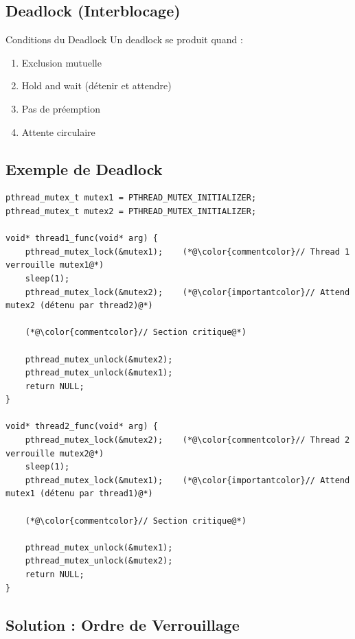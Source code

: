 \documentclass[11pt,a4paper]{article}
\begin{document}
\subsection{Deadlock (Interblocage)}

\begin{importantbox}{Conditions du Deadlock}
Un deadlock se produit quand :
\begin{enumerate}
    \item Exclusion mutuelle
    \item Hold and wait (détenir et attendre)
    \item Pas de préemption
    \item Attente circulaire
\end{enumerate}
\end{importantbox}

\subsection{Exemple de Deadlock}

\begin{lstlisting}[caption={Situation de deadlock}]
pthread_mutex_t mutex1 = PTHREAD_MUTEX_INITIALIZER;
pthread_mutex_t mutex2 = PTHREAD_MUTEX_INITIALIZER;

void* thread1_func(void* arg) {
    pthread_mutex_lock(&mutex1);    (*@\color{commentcolor}// Thread 1 verrouille mutex1@*)
    sleep(1);
    pthread_mutex_lock(&mutex2);    (*@\color{importantcolor}// Attend mutex2 (détenu par thread2)@*)
    
    (*@\color{commentcolor}// Section critique@*)
    
    pthread_mutex_unlock(&mutex2);
    pthread_mutex_unlock(&mutex1);
    return NULL;
}

void* thread2_func(void* arg) {
    pthread_mutex_lock(&mutex2);    (*@\color{commentcolor}// Thread 2 verrouille mutex2@*)
    sleep(1);
    pthread_mutex_lock(&mutex1);    (*@\color{importantcolor}// Attend mutex1 (détenu par thread1)@*)
    
    (*@\color{commentcolor}// Section critique@*)
    
    pthread_mutex_unlock(&mutex1);
    pthread_mutex_unlock(&mutex2);
    return NULL;
}
\end{lstlisting}

\subsection{Solution : Ordre de Verrouillage}
\end{document}
